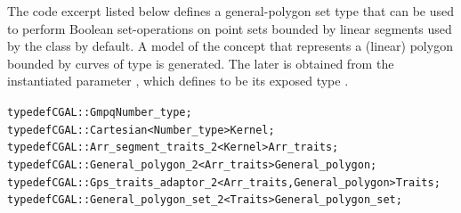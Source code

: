 The code excerpt listed below defines a general-polygon set type that
can be used to perform Boolean set-operations on point sets bounded by
linear segments used by the  class by default. A
model of the  concept that represents a
(linear) polygon bounded by curves of type  is
generated. The later is obtained from the instantiated parameter
, which defines  to be
its exposed type .
\begin{alltt}
typedef CGAL::Gmpq                                             Number_type;
typedef CGAL::Cartesian<Number_type>                           Kernel;
typedef CGAL::Arr_segment_traits_2<Kernel>                     Arr_traits;
typedef CGAL::General_polygon_2<Arr_traits>                    General_polygon;
typedef CGAL::Gps_traits_adaptor_2<Arr_traits,General_polygon> Traits;
typedef CGAL::General_polygon_set_2<Traits>                    General_polygon_set;
\end{alltt}


